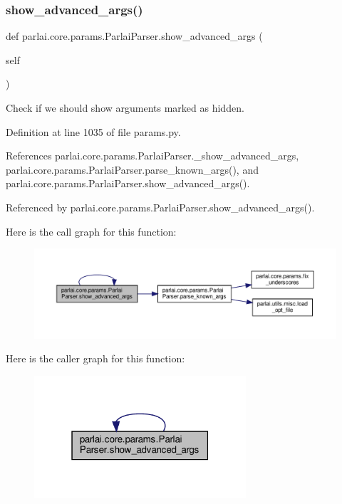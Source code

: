\subsubsection{\texorpdfstring{show\+\_\+advanced\+\_\+args()}{show\_advanced\_args()}}
{\footnotesize\ttfamily def parlai.\+core.\+params.\+Parlai\+Parser.\+show\+\_\+advanced\+\_\+args (\begin{DoxyParamCaption}\item[{}]{self }\end{DoxyParamCaption})}

\begin{DoxyVerb}Check if we should show arguments marked as hidden.\end{DoxyVerb}
 

Definition at line 1035 of file params.\+py.



References parlai.\+core.\+params.\+Parlai\+Parser.\+\_\+show\+\_\+advanced\+\_\+args, parlai.\+core.\+params.\+Parlai\+Parser.\+parse\+\_\+known\+\_\+args(), and parlai.\+core.\+params.\+Parlai\+Parser.\+show\+\_\+advanced\+\_\+args().



Referenced by parlai.\+core.\+params.\+Parlai\+Parser.\+show\+\_\+advanced\+\_\+args().

Here is the call graph for this function\+:
\nopagebreak
\begin{figure}[H]
\begin{center}
\leavevmode
\includegraphics[width=350pt]{classparlai_1_1core_1_1params_1_1ParlaiParser_a3a75bdeee002ed5a50706f1a6c9797c8_cgraph}
\end{center}
\end{figure}
Here is the caller graph for this function\+:
\nopagebreak
\begin{figure}[H]
\begin{center}
\leavevmode
\includegraphics[width=223pt]{classparlai_1_1core_1_1params_1_1ParlaiParser_a3a75bdeee002ed5a50706f1a6c9797c8_icgraph}
\end{center}
\end{figure}


